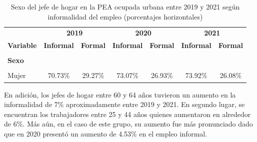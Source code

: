 \documentclass[
  letterpaper,
  12pt,
  oneside,
  spanish,
  doublespacing,
  headsepline,
  parskip]{MastersDoctoralThesis}
\begin{document}
\hypertarget{tbl-sex}{}
\begin{table}[H]
\caption{\label{tbl-sex}Sexo del jefe de hogar en la PEA ocupada urbana entre 2019 y 2021 según
informalidad del empleo (porcentajes horizontales) }\tabularnewline

\centering\begingroup\fontsize{10}{12}\selectfont

\begin{tabular}{lcccccc}
\toprule
\multicolumn{1}{c}{ } & \multicolumn{2}{c}{\textbf{2019}} & \multicolumn{2}{c}{\textbf{2020}} & \multicolumn{2}{c}{\textbf{2021}} \\
\cmidrule(l{3pt}r{3pt}){2-3} \cmidrule(l{3pt}r{3pt}){4-5} \cmidrule(l{3pt}r{3pt}){6-7}
\textbf{Variable} & \textbf{Informal} & \textbf{Formal} & \textbf{Informal} & \textbf{Formal} & \textbf{Informal} & \textbf{Formal}\\
\midrule
\cellcolor{gray!6}{\textbf{Nacional}} & \cellcolor{gray!6}{62.98\%} & \cellcolor{gray!6}{37.02\%} & \cellcolor{gray!6}{66.17\%} & \cellcolor{gray!6}{33.83\%} & \cellcolor{gray!6}{68.45\%} & \cellcolor{gray!6}{31.55\%}\\
\textbf{Sexo} &  &  &  &  &  & \\
\cellcolor{gray!6}{Hombre} & \cellcolor{gray!6}{60.09\%} & \cellcolor{gray!6}{39.91\%} & \cellcolor{gray!6}{63.52\%} & \cellcolor{gray!6}{36.48\%} & \cellcolor{gray!6}{65.98\%} & \cellcolor{gray!6}{34.02\%}\\
Mujer & 70.73\% & 29.27\% & 73.07\% & 26.93\% & 73.92\% & 26.08\%\\
\bottomrule
\end{tabular}
\endgroup{}
\end{table}

En adición, los jefes de hogar entre 60 y 64 años tuvieron un aumento en
la informalidad de 7\% aproximadamente entre 2019 y 2021. En segundo
lugar, se encuentran los trabajadores entre 25 y 44 años quienes
aumentaron en alrededor de 6\%. Más aún, en el caso de este grupo, su
aumento fue más pronunciado dado que en 2020 presentó un aumento de
4.53\% en el empleo informal.
\end{document}
